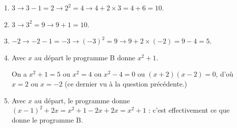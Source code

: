 
\medskip 

%
%
%

\begin{enumerate}
\item %
$3 \to 3 - 1 = 2 \to 2^2 = 4 \to 4 + 2\times 3 = 4 + 6 = 10$. 
\item %
$3 \to 3^2 = 9 \to 9 + 1 = 10$.
\item %
$- 2 \to -2 - 1 = - 3 \to (- 3)^2 = 9 \to 9 + 2 \times (- 2) = 9 - 4 = 5$. 
\item %
Avec $x$ au départ le programme B donne $x^2 + 1$.

On a $x^2 + 1 = 5$ ou $x^2 = 4$ ou $x^2 - 4 = 0$ ou $(x + 2)(x - 2) = 0$, d'où $x = 2$ ou $x = - 2$ (ce dernier vu à la question précédente.)
\item %
Avec $x$ au départ, le programme donne $(x - 1)^2+ 2x = x^2 + 1 - 2x + 2x = x^2 + 1$ : c'est effectivement ce que donne le programme B. 
\end{enumerate}

\bigskip

